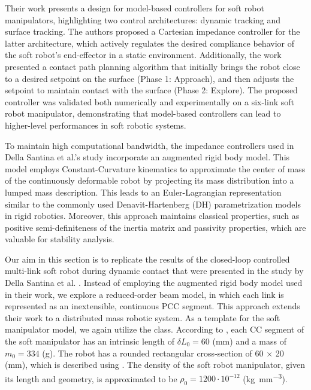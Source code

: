 Their work presents a design for model-based controllers for soft robot manipulators, highlighting two control architectures: dynamic tracking and surface tracking. The authors proposed a Cartesian impedance controller for the latter architecture, which actively regulates the desired compliance behavior of the soft robot's end-effector in a static environment. Additionally, the work presented a contact path planning algorithm that initially brings the robot close to a desired setpoint on the surface (Phase 1: Approach), and then adjusts the setpoint to maintain contact with the surface (Phase 2: Explore). The proposed controller was validated both numerically and experimentally on a six-link soft robot manipulator, demonstrating that model-based controllers can lead to higher-level performances in soft robotic systems.

To maintain high computational bandwidth, the impedance controllers used in Della Santina et al.'s study \cite{DellaSantina2020a} incorporate an augmented rigid body model. This model employs Constant-Curvature kinematics to approximate the center of mass of the continuously deformable robot by projecting its mass distribution into a lumped mass description. This leads to an Euler-Lagrangian representation similar to the commonly used Denavit-Hartenberg (DH) parametrization models in rigid robotics. Moreover, this approach maintains classical properties, such as positive semi-definiteness of the inertia matrix and passivity properties, which are valuable for stability analysis.

Our aim in this section is to replicate the results of the closed-loop controlled multi-link soft robot during dynamic contact that were presented in the study by Della Santina et al. \cite{DellaSantina2020a}. Instead of employing the augmented rigid body model used in their work, we explore a reduced-order beam model, in which each link is represented as an inextensible, continuous PCC segment. This approach extends their work to a distributed mass robotic system. As a template for the soft manipulator model, we again utilize the  class. According to \cite{DellaSantina2020a}, each CC segment of the soft manipulator has an intrinsic length of $\delta L_0 = 60$ (mm) and a mass of $m_0 = 334$ (g). The robot has a rounded rectangular cross-section of 60 $\times$ 20 (mm), which is described using . The density of the soft robot manipulator, given its length and geometry, is approximated to be $\rho_0 = 1200 \cdot 10^{-12}$ (\si{\kilo \gram \per \milli \metre \cubed}). 

